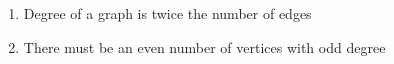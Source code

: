 \documentclass{article}
\begin{document}
\begin{enumerate}

\item Degree of a graph is twice the number of edges

\item There must be an even number of vertices with odd degree

\end{enumerate}
\end{document}
